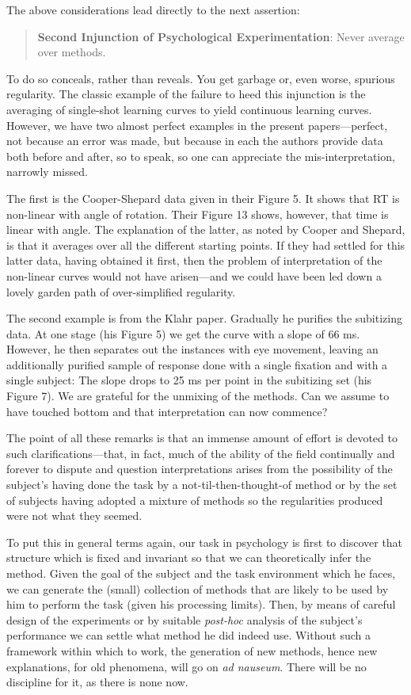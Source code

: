 \documentclass{paper}
\newcounter{oldpagecounter}
\newcommand\oldpage{\stepcounter{oldpagecounter}\marginpar{\footnotesize{\textcolor{mygrey}{pg. \arabic{oldpagecounter}}}}}
\begin{document}
The above considerations lead directly to the next assertion:
\begin{quote}
  \textbf{Second Injunction of Psychological Experimentation}: Never average
  over methods.
\end{quote}

To do so conceals, rather than reveals. You get garbage or, even worse, spurious regularity. The classic example of the failure to heed this injunction is the averaging of single-shot learning curves to yield continuous learning curves. However, we have two almost perfect examples in the present papers---perfect, not because an error was made, but because in each the authors provide data both before and after, so to speak, so one can appreciate the mis-interpretation, narrowly missed.

The first is the Cooper-Shepard data given in their Figure 5. It shows that RT is non-linear with angle of rotation. Their Figure 13 shows, however, that time is linear with angle. The explanation of the latter, as noted by Cooper and Shepard, is that it averages over all the different starting points. If they had settled for this latter data, having obtained it first, then the problem of interpretation of the non-linear curves would not have arisen---and we could have been led down a lovely garden path of over-simplified regularity.

The second example is from the Klahr paper. Gradually he purifies the subitizing data. At one stage (his Figure 5) we get the curve with a slope of 66 ms. However, he then separates out the instances with eye movement, leaving an additionally purified sample of response done with a single fixation and with a single subject: The slope drops to 25 ms per point in the subitizing set (his Figure 7). We are grateful for the unmixing of the methods. Can we assume to have touched bottom and that interpretation can now commence?

The point of all these remarks is that an immense amount of effort is devoted to such clarifications---that, in fact, much of the ability of the field \oldpage continually and forever to dispute and question interpretations arises from the possibility of the subject's having done the task by a not-til-then-thought-of method or by the set of subjects having adopted a mixture of methods so the regularities produced were not what they seemed. 

To put this in general terms again, our task in psychology is first to discover that structure which is fixed and invariant so that we can theoretically infer the method. Given the goal of the subject and the task environment which he faces, we can generate the (small) collection of methods that are likely to be used by him to perform the task (given his processing limits). Then, by means of careful design of the experiments or by suitable \textit{post-hoc} analysis of the subject's performance we can settle what method he did indeed use. Without such a framework within which to work, the generation of new methods, hence new explanations, for old phenomena, will go on \textit{ad nauseum}. There will be no discipline for it, as there is none now.
\end{document}
